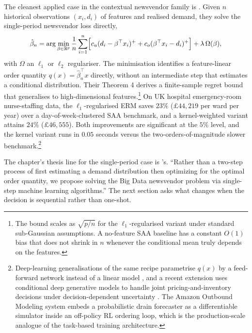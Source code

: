 The cleanest applied case in the contextual newsvendor family is
\citet{BanRudin2019}. Given $n$ historical observations $(x_i, d_i)$ of
features and realised demand, they solve the single-period newsvendor
loss directly,
\begin{equation}
\hat\beta_n = \arg\min_{\beta \in \mathbb R^p}\frac{1}{n} \sum_{i=1}^n
\Bigl[ c_u (d_i - \beta^\top x_i)^+ + c_o (\beta^\top x_i - d_i)^+ \Bigr]
+ \lambda\, \Omega(\beta),
\label{eq:banrudin_erm}
\end{equation}
with $\Omega$ an $\ell_1$ or $\ell_2$ regulariser. The minimisation
identifies a feature-linear order quantity $q(x) = \hat\beta_n^\top x$
directly, without an intermediate step that estimates a conditional
distribution. Their Theorem 4 derives a finite-sample regret bound that
generalises \citet{Levi2007} to high-dimensional features.\footnote{The bound
scales as $\sqrt{p/n}$ for the $\ell_1$-regularised variant under standard
sub-Gaussian assumptions. A no-feature SAA baseline has a constant $O(1)$
bias that does not shrink in $n$ whenever the conditional mean truly
depends on the features.} On UK hospital emergency-room nurse-staffing
data, the $\ell_1$-regularised ERM saves $23\%$ ($\pounds 44{,}219$ per
ward per year) over a day-of-week-clustered SAA benchmark, and a
kernel-weighted variant attains $24\%$ ($\pounds 46{,}555$). Both
improvements are significant at the $5\%$ level, and the kernel variant
runs in $0.05$ seconds versus the two-orders-of-magnitude slower
benchmark.\footnote{Deep-learning generalisations of the same recipe
parametrise $q(x)$ by a feed-forward network instead of a linear model
\citep{Oroojlooyjadid2020}, and a recent extension uses conditional deep
generative models to handle joint pricing-and-inventory decisions under
decision-dependent uncertainty \citep{HanZhengMisra2024}. The Amazon
Outbound Modeling system \citep{Amazon2025} embeds a probabilistic drain
forecaster as a differentiable simulator inside an off-policy RL ordering
loop, which is the production-scale analogue of the
\citet{DontiAmosKolter2017} task-based training architecture.}

The chapter's thesis line for the single-period case is
\citet{BanRudin2019}'s. ``Rather than a two-step process of first
estimating a demand distribution then optimizing for the optimal order
quantity, we propose solving the Big Data newsvendor problem via
single-step machine learning algorithms.'' The next section asks what
changes when the decision is sequential rather than one-shot.
